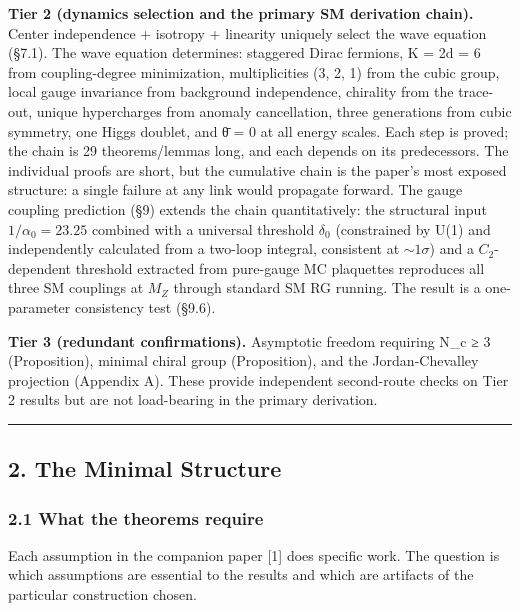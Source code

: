 \documentclass[
  11pt,
]{article}
\begin{document}
\textbf{Tier 2 (dynamics selection and the primary SM derivation
chain).} Center independence + isotropy + linearity uniquely select the
wave equation (§7.1). The wave equation determines: staggered Dirac
fermions, K = 2d = 6 from coupling-degree minimization, multiplicities
(3, 2, 1) from the cubic group, local gauge invariance from background
independence, chirality from the trace-out, unique hypercharges from
anomaly cancellation, three generations from cubic symmetry, one Higgs
doublet, and θ̄ = 0 at all energy scales. Each step is proved; the chain
is 29 theorems/lemmas long, and each depends on its predecessors. The
individual proofs are short, but the cumulative chain is the paper's
most exposed structure: a single failure at any link would propagate
forward. The gauge coupling prediction (§9) extends the chain
quantitatively: the structural input \(1/\alpha_0 = 23.25\) combined
with a universal threshold \(\delta_0\) (constrained by U(1) and
independently calculated from a two-loop integral, consistent at
\(\sim 1\sigma\)) and a \(C_2\)-dependent threshold extracted from
pure-gauge MC plaquettes reproduces all three SM couplings at \(M_Z\)
through standard SM RG running. The result is a one-parameter
consistency test (§9.6).

\textbf{Tier 3 (redundant confirmations).} Asymptotic freedom requiring
N\_c ≥ 3 (Proposition), minimal chiral group (Proposition), and the
Jordan-Chevalley projection (Appendix A). These provide independent
second-route checks on Tier 2 results but are not load-bearing in the
primary derivation.

\begin{center}\rule{0.5\linewidth}{0.5pt}\end{center}

\hypertarget{the-minimal-structure}{%
\subsection{2. The Minimal Structure}\label{the-minimal-structure}}

\hypertarget{what-the-theorems-require}{%
\subsubsection{2.1 What the theorems
require}\label{what-the-theorems-require}}

Each assumption in the companion paper {[}1{]} does specific work. The
question is which assumptions are essential to the results and which are
artifacts of the particular construction chosen.
\end{document}
